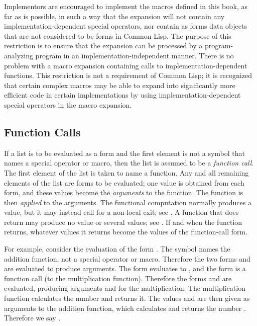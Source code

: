 \beforenoterule
\begin{implementation}
Implementors are encouraged to implement the macros
defined in this book, as far as is possible, in such a way that
the expansion will not contain any implementation-dependent
special operators, nor contain as forms data objects that
are not considered to be forms in Common Lisp.
The purpose of this restriction is to ensure that the expansion
can be processed by a program-analyzing program in an
implementation-independent manner.
There is no problem with a macro expansion containing
calls to implementation-dependent functions.
This restriction is not a requirement of Common Lisp; it is recognized
that certain complex macros may be able to expand into significantly
more efficient code in certain implementations
by using implementation-dependent special operators in the macro expansion.
\end{implementation}
\afternoterule

\subsection{Function Calls}

If a list is to be evaluated as a form and the first element is
not a symbol that names a special operator or macro, then the list
is assumed to be a \emph{function call}.  The first element of the
list is taken to name a function.  Any and all remaining elements
of the list are forms to be evaluated; one value is obtained
from each form,
and these values become the \emph{arguments} to the function.
The function is then \emph{applied} to the arguments.
The functional computation normally produces a value,
but it may instead call for a non-local exit; see .
A function that does return may produce no value or several values;
see .
If and when the function returns, whatever values it returns
become the values of the function-call form.

For example, consider the evaluation of the form .
The symbol \cdf{+} names the addition function, not a special operator or macro.
Therefore the two forms  and  are evaluated to produce
arguments.  The form  evaluates to , and the form
 is a function call (to the multiplication function).
Therefore the forms  and  are evaluated, producing arguments
 and  for the multiplication.  The multiplication function
calculates the number  and returns it.  The values  and 
are then given as arguments to the addition function, which calculates
and returns the number .  Therefore we say .

